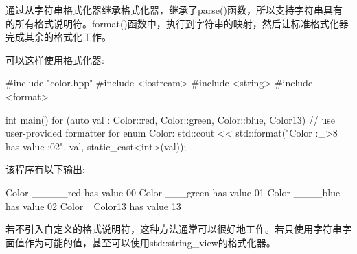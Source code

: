 通过从字符串格式化器继承格式化器，继承了parse()函数，所以支持字符串具有的所有格式说明符。format()函数中，执行到字符串的映射，然后让标准格式化器完成其余的格式化工作。

可以这样使用格式化器:


\begin{cpp}
#include "color.hpp"
#include <iostream>
#include <string>
#include <format>

int main()
{
	for (auto val : {Color::red, Color::green, Color::blue, Color{13}}) {
		// use user-provided formatter for enum Color:
		std::cout << std::format("Color {:_>8} has value {:02}\n",
								  val, static_cast<int>(val));
	}
}
\end{cpp}

该程序有以下输出:

\begin{shell}
Color _____red has value 00
Color ___green has value 01
Color ____blue has value 02
Color _Color13 has value 13
\end{shell}

若不引入自定义的格式说明符，这种方法通常可以很好地工作。若只使用字符串字面值作为可能的值，甚至可以使用std::string\_view的格式化器。




